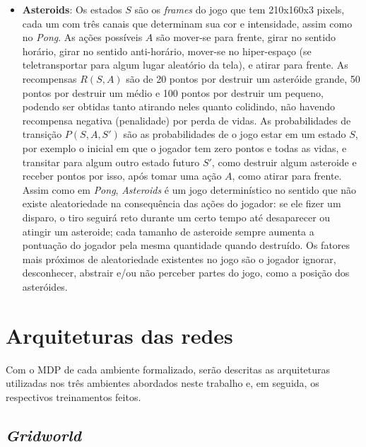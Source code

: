 \begin{itemize}
\item \textbf{Asteroids}:
Os estados $S$ são os \textit{frames} do jogo que tem 210x160x3 pixels, cada um com três canais que determinam sua cor e intensidade, assim como no \textit{Pong}.
As ações possíveis $A$ são mover-se para frente, girar no sentido horário, girar no sentido anti-horário, mover-se no hiper-espaço (se teletransportar para algum lugar aleatório da tela), e atirar para frente.
As recompensas $R(S,A)$ são de 20 pontos por destruir um asteróide grande, 50 pontos por destruir um médio e 100 pontos por destruir um pequeno, podendo ser obtidas tanto atirando neles quanto colidindo, não havendo recompensa negativa (penalidade) por perda de vidas.
As probabilidades de transição $P(S,A,S')$ são as probabilidades de o jogo estar em um estado $S$, por exemplo o inicial em que o jogador tem zero pontos e todas as vidas, e transitar para algum outro estado futuro $S'$, como destruir algum asteroide e receber pontos por isso, após tomar uma ação $A$, como atirar para frente.
Assim como em \textit{Pong}, \textit{Asteroids} é um jogo determinístico no sentido que não existe aleatoriedade na consequência das ações do jogador: se ele fizer um disparo, o tiro seguirá reto durante um certo tempo até desaparecer ou atingir um asteroide; cada tamanho de asteroide sempre aumenta a pontuação do jogador pela mesma quantidade quando destruído.
Os fatores mais próximos de aleatoriedade existentes no jogo são o jogador ignorar, desconhecer, abstrair e/ou não perceber partes do jogo, como a posição dos asteróides.
\end{itemize}


\section{Arquiteturas das redes}
\label{sec:arq}

Com o MDP de cada ambiente formalizado, serão descritas as arquiteturas utilizadas nos três ambientes abordados neste trabalho e, em seguida, os respectivos treinamentos feitos.

\subsection{\textit{Gridworld}}
\label{sec:arq_gw}

